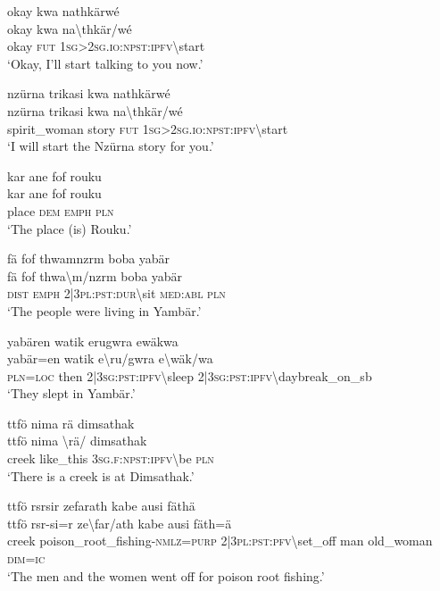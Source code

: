 \ea\label{ex:6:a1189}
okay kwa nathkärwé\\
\gll okay	kwa	na{\textbackslash}thkär/wé\\
     okay	\textsc{fut}	1\textsc{sg}>2\textsc{sg}.\textsc{io}:\textsc{npst}:\textsc{ipfv}{\textbackslash}start\\
\glt `Okay, I'll start talking to you now.'
\z

\ea\label{ex:6:a1190}
nzürna trikasi kwa nathkärwé\\
\gll nzürna	trikasi	kwa	na{\textbackslash}thkär/wé\\
     spirit\_woman	story	\textsc{fut}	1\textsc{sg}>2\textsc{sg}.\textsc{io}:\textsc{npst}:\textsc{ipfv}{\textbackslash}start\\
\glt `I will start the Nzürna story for you.'
\z

\ea\label{ex:6:a1191}
kar ane fof rouku\\
\gll kar	ane	fof	rouku\\
     place	\textsc{dem}	\textsc{emph}	\textsc{pln}\\
\glt `The place (is) Rouku.'
\z

\ea\label{ex:6:a1193}
fä fof thwamnzrm boba yabär\\
\gll fä	fof	thwa{\textbackslash}m/nzrm	boba	yabär\\
     \textsc{dist}	\textsc{emph}	2|3\textsc{pl}:\textsc{pst}:\textsc{dur}{\textbackslash}sit	\textsc{med}:\textsc{abl}	\textsc{pln}\\
\glt `The people were living in Yambär.'
\z

\ea\label{ex:6:a1194}
yabären watik erugwra ewäkwa\\
\gll yabär=en	watik	e{\textbackslash}ru/gwra	e{\textbackslash}wäk/wa\\
     \textsc{pln}=\textsc{loc}	then	2|3\textsc{sg}:\textsc{pst}:\textsc{ipfv}{\textbackslash}sleep	2|3\textsc{sg}:\textsc{pst}:\textsc{ipfv}{\textbackslash}daybreak\_on\_sb\\
\glt `They slept in Yambär.'
\z

\ea\label{ex:6:a1196}
ttfö nima rä dimsathak\\
\gll ttfö	nima	{\textbackslash}rä/	dimsathak\\
     creek	like\_this	3\textsc{sg}.\textsc{f}:\textsc{npst}:\textsc{ipfv}{\textbackslash}be	\textsc{pln}\\
\glt `There is a creek is at Dimsathak.'
\z

\ea\label{ex:6:a1198}
ttfö rsrsir zefarath kabe ausi fäthä\\
\gll ttfö	rsr-si=r	ze{\textbackslash}far/ath	kabe	ausi	fäth=ä\\
     creek	poison\_root\_fishing-\textsc{nmlz}=\textsc{purp}	2|3\textsc{pl}:\textsc{pst}:\textsc{pfv}{\textbackslash}set\_off	man	old\_woman	\textsc{dim}=\textsc{ic}\\
\glt `The men and the women went off for poison root fishing.'
\z

